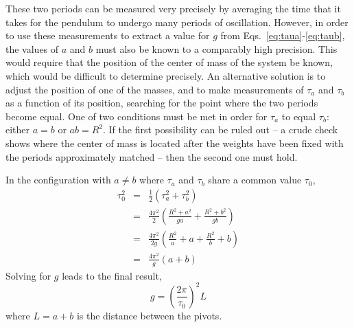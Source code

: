 \documentclass{revtex4}
\begin{document}
These two periods can be measured very precisely by averaging the time
that it takes for the pendulum to undergo many periods of oscillation.
However, in order to use these measurements to extract a value for $g$
from Eqs.~\ref{eq:taua}-\ref{eq:taub}, the values of $a$ and $b$ must also
be known to a comparably high precision.  This would require that the 
position of the center of mass of the system be known, which would be
difficult to determine precisely.  An alternative solution is to adjust
the position of one of the masses, and to make measurements of $\tau_a$
and $\tau_b$ as a function of its position, searching for the point where
the two periods become equal.  One of two conditions must be met in order
for $\tau_a$ to equal $\tau_b$: either $a=b$ or $ab = R^2$.  If the first
possibility can be ruled out -- a crude check shows where the center of mass
is located after the weights have been fixed with the periods approximately
matched -- then the second one must hold.
 
In the configuration with $a\neq b$ where $\tau_a$ and $\tau_b$ share
a common value $\tau_0$,
\begin{eqnarray}
\tau_0^2 &=& \frac{1}{2}(\tau_a^2 + \tau_b^2) \nonumber \\
         &=& \frac{4\pi^2}{2}\left(\frac{R^2+a^2}{ga}+\frac{R^2+b^2}{gb}\right)
                                              \nonumber \\
         &=& \frac{4\pi^2}{2g}\left(\frac{R^2}{a}+a+\frac{R^2}{b}+b\right)
                                              \nonumber \\
         &=& \frac{4\pi^2}{g}\left(a+b\right) 
\end{eqnarray}
Solving for $g$ leads to the final result,
\begin{equation}
g = \left(\frac{2\pi}{\tau_0}\right)^2 L \label{eq:finalresult}
\end{equation}
where $L = a+b$ is the distance between the pivots.
\end{document}

